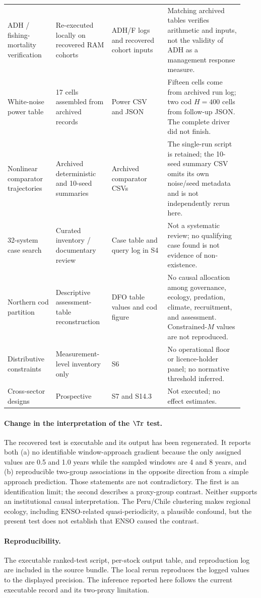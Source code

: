 \begin{longtable}{@{}p{0.19\linewidth}p{0.22\linewidth}p{0.22\linewidth}p{0.30\linewidth}@{}}
ADH / fishing-mortality verification & Re-executed locally on recovered RAM cohorts & ADH/F logs and recovered cohort inputs & Matching archived tables verifies arithmetic and inputs, not the validity of ADH as a management response measure. \\
White-noise power table & 17 cells assembled from archived records & Power CSV and JSON & Fifteen cells come from archived run log; two cod \(H=400\) cells from follow-up JSON. The complete driver did not finish. \\
Nonlinear comparator trajectories & Archived deterministic and 10-seed summaries & Archived comparator CSVs & The single-run script is retained; the 10-seed summary CSV omits its own noise/seed metadata and is not independently rerun here. \\
32-system case search & Curated inventory / documentary review & Case table and query log in S4 & Not a systematic review; no qualifying case found is not evidence of non-existence. \\
Northern cod partition & Descriptive assessment-table reconstruction & DFO table values and cod figure & No causal allocation among governance, ecology, predation, climate, recruitment, and assessment. Constrained-\(M\) values are not reproduced. \\
Distributive constraints & Measurement-level inventory only & S6 & No operational floor or licence-holder panel; no normative threshold inferred. \\
Cross-sector designs & Prospective & S7 and S14.3 & Not executed; no effect estimates. \\

\end{longtable}

\paragraph{Change in the interpretation of the \(\Tr\) test.} The recovered test is executable and its output has been regenerated. It reports both (a) no identifiable window-approach gradient because the only assigned values are 0.5 and 1.0 years while the sampled windows are 4 and 8 years, and (b) reproducible two-group associations in the opposite direction from a simple approach prediction. Those statements are not contradictory. The first is an identification limit; the second describes a proxy-group contrast. Neither supports an institutional causal interpretation. The Peru/Chile clustering makes regional ecology, including ENSO-related quasi-periodicity, a plausible confound, but the present test does not establish that ENSO caused the contrast.

\paragraph{Reproducibility.} The executable ranked-test script, per-stock output table, and reproduction log are included in the source bundle. The local rerun reproduces the logged values to the displayed precision. The inference reported here follows the current executable record and its two-proxy limitation.
